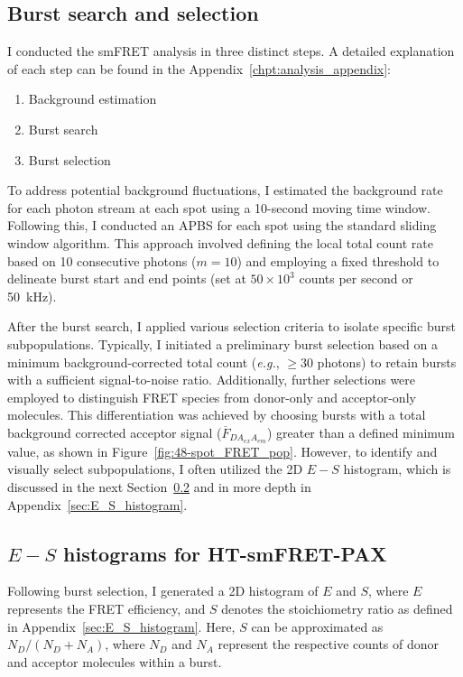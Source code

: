 \subsection{Burst search and selection}
\label{sec:burst_search_and_selection_PAX_analysis}

I conducted the \ac{smFRET} analysis in three distinct steps.
A detailed explanation of each step can be found in the  Appendix~\ref{chpt:analysis_appendix}:

\begin{enumerate}
\item Background estimation
\item Burst search
\item Burst selection
\end{enumerate}

To address potential background fluctuations, I estimated the background rate for each photon stream at each spot using a 10-second moving time window. 
Following this, I conducted an \ac{APBS} for each spot using the standard sliding window algorithm. 
This approach involved defining the local total count rate based on 10 consecutive photons ($m=10$) and employing a fixed threshold to delineate burst start and end points (set at $50\times 10^{3}$ counts per second or 50~kHz).

After the burst search, I applied various selection criteria to isolate specific burst subpopulations. 
Typically, I initiated a preliminary burst selection based on a minimum background-corrected total count (\textit{e.g.}, $\geq 30$ photons) to retain bursts with a sufficient signal-to-noise ratio. 
Additionally, further selections were employed to distinguish FRET species from donor-only and acceptor-only molecules. 
This differentiation was achieved by choosing bursts with a total background corrected acceptor signal ($\overline{F}_{DA_{ex}A_{em}}$) greater than a defined minimum value, as shown in Figure~\ref{fig:48-spot_FRET_pop}. 
However, to identify and visually select subpopulations, I often utilized the 2D $E-S$ histogram, which is discussed in the next Section~\ref{sec:Epr_Su_PAX} and in more depth in Appendix~\ref{sec:E_S_histogram}.

\subsection{$E - S$ histograms for HT-smFRET-PAX}
\label{sec:Epr_Su_PAX}

Following burst selection, I generated a 2D histogram of $E$ and $S$, where $E$ represents the FRET efficiency, and $S$ denotes the stoichiometry ratio as defined in Appendix~\ref{sec:E_S_histogram}. 
Here, $S$ can be approximated as $N_D / (N_D + N_A)$, where $N_D$ and $N_A$ represent the respective counts of donor and acceptor molecules within a burst.

